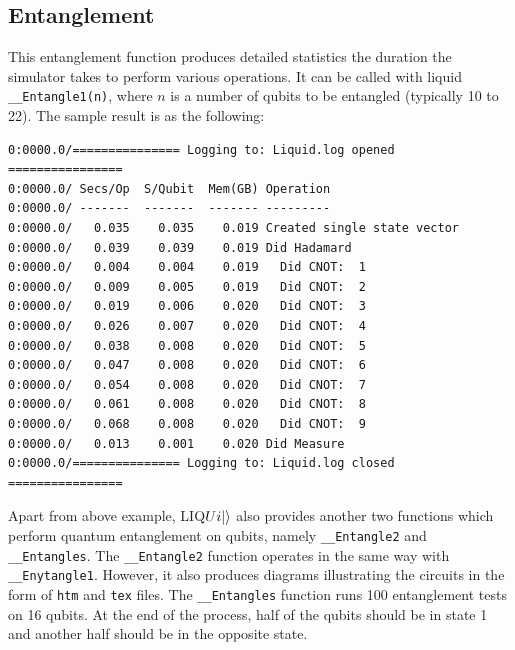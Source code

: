 \documentclass[12pt]{third-rep}
\begin{document}
\subsection{Entanglement}
This entanglement function produces detailed statistics the duration the simulator takes to perform various operations. It can be called with liquid \texttt{\_\_Entangle1(n)}, where $n$ is a number of qubits to be entangled (typically 10 to 22). The sample result is as the following:
\begin{verbatim}
0:0000.0/=============== Logging to: Liquid.log opened ================
0:0000.0/ Secs/Op  S/Qubit  Mem(GB) Operation
0:0000.0/ -------  -------  ------- ---------
0:0000.0/   0.035    0.035    0.019 Created single state vector
0:0000.0/   0.039    0.039    0.019 Did Hadamard
0:0000.0/   0.004    0.004    0.019   Did CNOT:  1
0:0000.0/   0.009    0.005    0.019   Did CNOT:  2
0:0000.0/   0.019    0.006    0.020   Did CNOT:  3
0:0000.0/   0.026    0.007    0.020   Did CNOT:  4
0:0000.0/   0.038    0.008    0.020   Did CNOT:  5
0:0000.0/   0.047    0.008    0.020   Did CNOT:  6
0:0000.0/   0.054    0.008    0.020   Did CNOT:  7
0:0000.0/   0.061    0.008    0.020   Did CNOT:  8
0:0000.0/   0.068    0.008    0.020   Did CNOT:  9
0:0000.0/   0.013    0.001    0.020 Did Measure
0:0000.0/=============== Logging to: Liquid.log closed ================
\end{verbatim}
Apart from above example, LIQ$Ui{\left\vert{}\right\rangle}$ also provides another two functions which perform quantum entanglement on qubits, namely \texttt{\_\_Entangle2} and \texttt{\_\_Entangles}. The \texttt{\_\_Entangle2} function operates in the same way with \texttt{\_\_Enytangle1}. However, it also produces diagrams illustrating the circuits in the form of \texttt{htm} and \texttt{tex} files. The \texttt{\_\_Entangles} function runs 100 entanglement tests on 16 qubits. At the end of the process, half of the qubits should be in state 1 and another half should be in the opposite state.
\end{document}
